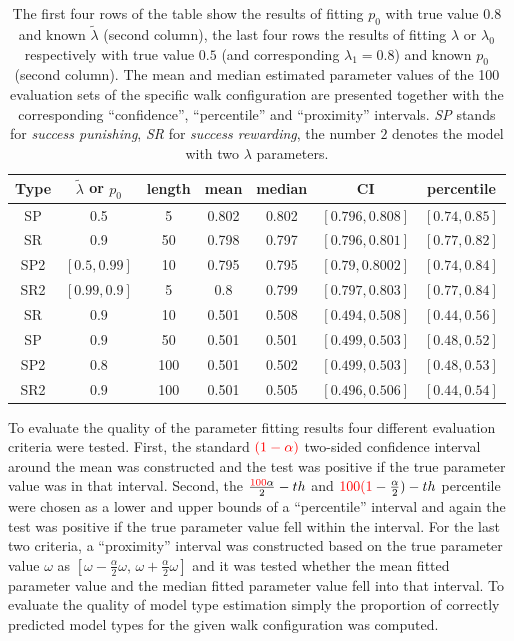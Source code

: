 \documentclass{amsart}
\theoremstyle{definition}
\theoremstyle{plain}
\theoremstyle{plain}
\theoremstyle{plain}
\numberwithin{equation}{section}
\begin{document}
\begin{table}
\begin{centering}
{\caption{\label{tab:Fitting-results} The first four rows of the table show the results of fitting $p_0$ with true value $0.8$ and known $\tilde{\lambda}$ (second column), the last four rows the results of fitting $\lambda$ or $\lambda_0$ respectively with true value $0.5$ (and corresponding $\lambda_1=0.8$) and known $p_0$ (second column). The mean and median {\color{red}estimated parameter} values of the 100 {\color{red}evaluation sets}  of the specific walk configuration are presented together with the corresponding ``confidence'', ``percentile'' and ``proximity'' intervals.  \emph{SP }stands for \emph{success punishing}, \emph{SR} for \emph{success rewarding}, the number $2$ denotes the model with two $\lambda$ parameters.}}
\begin{tabular}{|c|c|c|c|c|c|c|}
\hline
 Type & $\tilde{\lambda}$ or $p_0$ & {\color{red}length} & mean & median & CI & percentile \tabularnewline
\hline
SP & 0.5 & 5 & 0.802 & 0.802 & $[0.796, 0.808]$ & $[0.74, 0.85]$ \tabularnewline
\hline
SR & 0.9 & 50 & 0.798 & 0.797 & $[0.796,0.801 ]$ & $[0.77, 0.82]$ \tabularnewline
\hline
SP2 & $[0.5,0.99]$ & 10 & 0.795 & 0.795 &$[0.79,0.8002]$  & $[0.74,0.84]$ \tabularnewline
\hline
SR2 &  $[0.99,0.9]$ & 5 & 0.8 & 0.799 & $[0.797,0.803]$ & $[0.77,0.84]$ \tabularnewline
\hline
\hline
SR & $0.9$ & 10 & 0.501 & 0.508 & $[0.494,0.508]$ & $[0.44,0.56]$ \tabularnewline
\hline
SP & $0.9$ & 50 & 0.501 & 0.501 & $[0.499,0.503]$ & $[0.48,0.52]$ \tabularnewline
\hline
SP2 & $0.8$ & 100 & 0.501 & 0.502 & $[0.499,0.503]$ & $[0.48,0.53]$ \tabularnewline
\hline
SR2 & $0.9$ & 100 & 0.501 & 0.505 & $[0.496,0.506]$ & $[0.44,0.54]$ \tabularnewline
\hline
\end{tabular}
\par\end{centering}
\end{table}

To evaluate the quality of the parameter fitting results four different {\color{red}evaluation} criteria were tested. First, the standard $\color{red}(1-\alpha)$ two-sided confidence interval around the mean was constructed and the test was positive if the true parameter value was in that interval. Second, the $\frac{{\color{red}100}\alpha}{2}-th$ and ${\color{red}100(1}-\frac{\alpha}{2})-th$ percentile were chosen as a lower and upper bounds of a ``percentile'' interval and again the test was positive if the true parameter value fell within the interval. {\color{red}For the last two criteria}, a ``proximity'' interval was constructed based on the true parameter value {\color{red}$\omega$ as $[\omega-\frac{\alpha}{2}\omega,\,\omega+\frac{\alpha}{2}\omega]$} and it was tested whether {\color{red}the mean} fitted parameter value and {\color{red} the median} fitted parameter value fell into that interval. To evaluate the quality of model type estimation simply the proportion of correctly predicted model types for the given walk configuration was computed.
\end{document}
